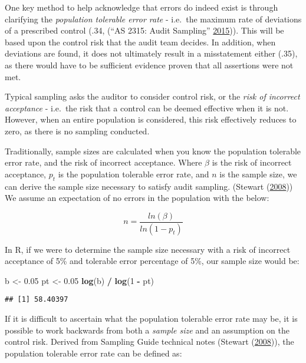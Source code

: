 \documentclass[
]{book}
\newenvironment{Shaded}{\begin{snugshade}}{\end{snugshade}}
\newcommand{\DecValTok}[1]{\textcolor[rgb]{0.00,0.00,0.81}{#1}}
\newcommand{\FloatTok}[1]{\textcolor[rgb]{0.00,0.00,0.81}{#1}}
\newcommand{\KeywordTok}[1]{\textcolor[rgb]{0.13,0.29,0.53}{\textbf{#1}}}
\newcommand{\NormalTok}[1]{#1}
\newcommand{\OperatorTok}[1]{\textcolor[rgb]{0.81,0.36,0.00}{\textbf{#1}}}
\newcommand{\StringTok}[1]{\textcolor[rgb]{0.31,0.60,0.02}{#1}}
\begin{document}
One key method to help acknowledge that errors do indeed exist is through clarifying the \emph{population tolerable error rate} - i.e.~the maximum rate of deviations of a prescribed control (.34, (``AS 2315: Audit Sampling'' \protect\hyperlink{ref-pcaob-as2315}{2015})). This will be based upon the control risk that the audit team decides. In addition, when deviations are found, it does not ultimately result in a misstatement either (.35), as there would have to be sufficient evidence proven that all assertions were not met.

Typical sampling asks the auditor to consider control risk, or the \emph{risk of incorrect acceptance} - i.e.~the risk that a control can be deemed effective when it is not. However, when an entire population is considered, this risk effectively reduces to zero, as there is no sampling conducted.

Traditionally, sample sizes are calculated when you know the population tolerable error rate, and the risk of incorrect acceptance. Where \(\beta\) is the risk of incorrect acceptance, \(p_{t}\) is the population tolerable error rate, and \(n\) is the sample size, we can derive the sample size necessary to satisfy audit sampling. (Stewart (\protect\hyperlink{ref-sampling-technical}{2008})) We assume an expectation of no errors in the population with the below:

\[
n = \frac{ln(\beta)}{ln(1 - p_{t})}
\]

In R, if we were to determine the sample size necessary with a risk of incorrect acceptance of 5\% and tolerable error percentage of 5\%, our sample size would be:

\begin{Shaded}
\begin{Highlighting}[]
\NormalTok{b <-}\StringTok{ }\FloatTok{0.05}
\NormalTok{pt <-}\StringTok{ }\FloatTok{0.05}
\KeywordTok{log}\NormalTok{(b) }\OperatorTok{/}\StringTok{ }\KeywordTok{log}\NormalTok{(}\DecValTok{1} \OperatorTok{-}\StringTok{ }\NormalTok{pt)}
\end{Highlighting}
\end{Shaded}

\begin{verbatim}
## [1] 58.40397
\end{verbatim}

If it is difficult to ascertain what the population tolerable error rate may be, it is possible to work backwards from both a \emph{sample size} and an assumption on the control risk. Derived from Sampling Guide technical notes (Stewart (\protect\hyperlink{ref-sampling-technical}{2008})), the population tolerable error rate can be defined as:
\end{document}
